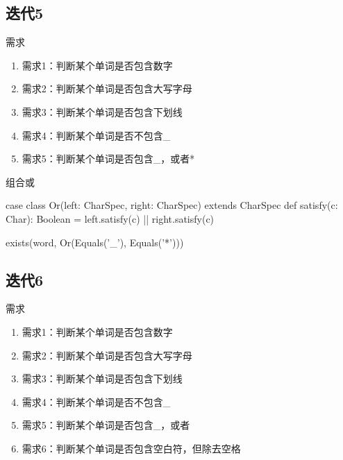 \subsection{迭代5}

\begin{frame}{需求}
  \begin{block}{}
    \begin{enumerate}
    \item \alert{需求1}：判断某个单词是否包含数字
    \item \alert{需求2}：判断某个单词是否包含大写字母
    \item \alert{需求3}：判断某个单词是否包含下划线 
    \item \alert{需求4}：判断某个单词是否不包含\_
    \item<alert@1-> 需求5：判断某个单词是否包含\_，或者*   
    \end{enumerate}
  \end{block}
\end{frame}

\begin{frame}[fragile]{组合或}
  \begin{scala}
case class Or(left: CharSpec, right: CharSpec) extends CharSpec {
  def satisfy(c: Char): Boolean = 
    left.satisfy(c) || right.satisfy(c)
}

exists(word, Or(Equals('_'), Equals('*')))
  \end{scala}
\end{frame}

\subsection{迭代6}

\begin{frame}{需求}
  \begin{block}{}
    \begin{enumerate}
    \item \alert{需求1}：判断某个单词是否包含数字
    \item \alert{需求2}：判断某个单词是否包含大写字母
    \item \alert{需求3}：判断某个单词是否包含下划线 
    \item \alert{需求4}：判断某个单词是否不包含\_
    \item \alert{需求5}：判断某个单词是否包含\_，或者\*     
    \item<alert@1-> 需求6：判断某个单词是否包含空白符，但除去空格     
    \end{enumerate}
  \end{block}
\end{frame}

